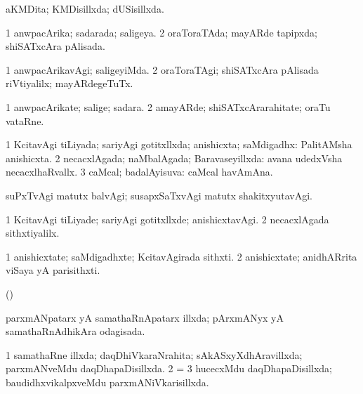 {\bentry
{} 
\gl{\gu}
\expl{}
\bmng
aKMDita; KMDisillxda; dUSisillxda. 
\emng
\eentry

\bentry
{} 
\gl{\gu}
\expl{}
\bmng
\bnum
\num{1} anwpacArika; sadarada; saligeya. 
\num{2} oraToraTAda; mayARde tapipxda; shiSATxcAra pAlisada. 
\enum
\emng
\eentry

\bentry
{} 
\gl{\kirxvi}
\expl{}
\bmng
\bnum
\num{1} anwpacArikavAgi; saligeyiMda. 
\num{2} oraToraTAgi; shiSATxcAra pAlisada riVtiyalilx; mayARdegeTuTx. 
\enum
\emng
\eentry

\bentry
{} 
\gl{\nA}
\expl{}
\bmng
\bnum
\num{1} anwpacArikate; salige; sadara. 
\num{2} amayARde; shiSATxcArarahitate; oraTu vataRne. 
\enum
\emng
\eentry

\bentry
{} 
\gl{\gu}
\expl{}
\bmng
\bnum
\num{1} KcitavAgi tiLiyada; sariyAgi gotitxllxda; anishicxta; saMdigadhx:  PalitAMsha anishicxta. 
\num{2} necacxlAgada; naMbalAgada; Baravaseyillxda:  avana udedxVsha necacxlhaRvallx. 
\num{3} caMcal; badalAyisuva:  caMcal havAmAna. 
\enum
\emng

\noindent 
\gl{\pagu}
\expl{}
\bmng
{} suPxTvAgi matutx balvAgi; susapxSaTxvAgi matutx shakitxyutavAgi. 
\emng
\eentry

\bentry
{} 
\gl{\kirxvi}
\expl{}
\bmng
\bnum
\num{1} KcitavAgi tiLiyade; sariyAgi gotitxllxde; anishicxtavAgi. 
\num{2} necacxlAgada sithxtiyalilx. 
\enum
\emng
\eentry

\bentry
{} 
\gl{\nA}
\bmng
\bnum
\num{1} anishicxtate; saMdigadhxte; KcitavAgirada sithxti. 
\num{2} anishicxtate; anidhARrita viSaya yA parisithxti. 
\enum
\emng
\eentry

\bentry
{}
\gl{\nA}
\expl{}
\bmng
(\Bwvi)  
\emng
\eentry

\bentry
{} 
\gl{\gu}
\expl{}
\bmng
parxmANpatarx yA samathaRnApatarx illxda; pArxmANyx yA samathaRnAdhikAra odagisada. 
\emng
\eentry

\bentry
{} 
\gl{\gu}
\expl{}
\bmng
\bnum
\num{1} samathaRne illxda; daqDhiVkaraNrahita; sAkASxyXdhAravillxda; parxmANveMdu daqDhapaDisillxda. 
\num{2} =  
\num{3} hucecxMdu daqDhapaDisillxda; baudidhxvikalpxveMdu parxmANiVkarisillxda. 
\enum
\emng
\eentry

}
